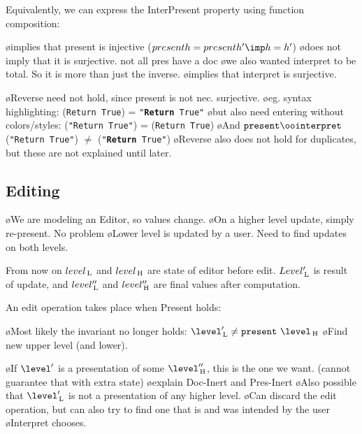 
Equivalently, we can express the {\sc InterPresent} property using function composition: 


\bl
\o implies that present is injective ($present h = present h' \imp h = h'$)
\o does not imply that it is surjective. not all pres have a doc
\o we also wanted interpret to be total. So it is more than just the inverse. 
\o implies that interpret is surjective.
\el

\bl
\o Reverse need not hold, since present is not nec. surjective.
\o eg. syntax highlighting: \present ({\tt Return True}) = {\tt "{\bf Return} True"}
\o but also need entering without colors/styles: \interpret ({\tt "Return True"}) = ({\tt Return True})
\o And $\present \oo \interpret$ ({\tt "Return True"}) $\neq$ ({\tt "{\bf Return} True"}) 
\o Reverse also does not hold for duplicates, but these are not explained until later.
\el

\subsection{Editing}

\bl
\o We are modeling an Editor, so values change.
\o On a higher level update, simply re-present. No problem
\o Lower level is updated by a user. Need to find updates on both levels.
\el


From now on $level_{\, \mathrm L}$ and $level_{\, \mathrm H}$ are state of editor before edit. $Level'_{\, \mathrm L}$ is result of update, and  $level''_{\, \mathrm L}$ and $level''_{\, \mathrm H}$ are final values after computation.

An edit operation takes place when {\sc Present} holds:


\bl
\o Most likely the invariant no longer holds: $\level'\L \neq \present~\level\H$
\o Find new upper level (and lower).
\el

\bl 
\o If  $\level'$ is a presentation of some $\level''\H$, this is the one we want. (cannot guarantee that with extra state)  
\o explain  {\sc Doc-Inert} and {\sc Pres-Inert}
\o Also possible that $\level'\L$ is not a presentation of any higher level. 
\o Can discard the edit operation, but can also try to find one that is and was intended by the user
\o Interpret chooses.
\el

